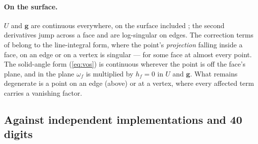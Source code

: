 \documentclass[10pt,a4paper]{article}
\begin{document}
\paragraph{On the surface.} $U$ and $\mathbf{g}$ are continuous everywhere, on the surface included
\citep{tsoulis2001}; the second derivatives jump across a face and are log-singular on edges. The
correction terms of \citet{tsoulis2001} belong to the line-integral form, where the point's
\emph{projection} falling inside a face, on an edge or on a vertex is singular --- for some face at
almost every point. The solid-angle form (\ref{eq:vos}) is continuous wherever the point is off the
face's plane, and in the plane $\omega_f$ is multiplied by $h_f=0$ in $U$ and $\mathbf{g}$. What
remains degenerate is a point on an edge (above) or at a vertex, where every affected term carries a
vanishing factor.

\subsection{Against independent implementations and 40 digits}\label{sec:codes}
\end{document}
